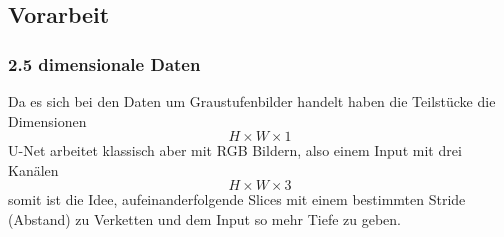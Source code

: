 \begin{table}[H]
 \begin{center}
   \caption{Metadaten dreier Teilstücke}\label{tabelle_meta_daten}
 \end{center}
\end{table}


\subsection{Vorarbeit}

\subsubsection{2.5 dimensionale Daten} \label{ssec:semi3D-data}

Da es sich bei den Daten um Graustufenbilder handelt haben die Teilstücke die Dimensionen 
\begin{equation}
H \times W \times 1
\end{equation}
U-Net arbeitet klassisch aber mit RGB Bildern, also einem Input mit drei Kanälen
\begin{equation}
H \times W \times 3
\end{equation}
somit ist die Idee, aufeinanderfolgende Slices mit einem bestimmten Stride (Abstand) zu Verketten und dem Input so mehr Tiefe zu geben.

